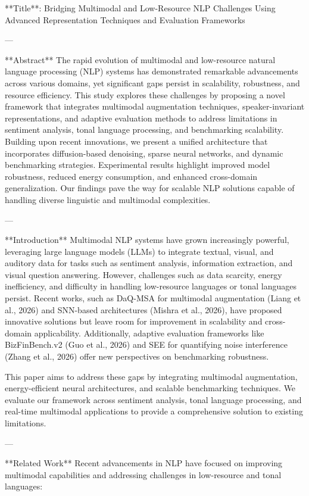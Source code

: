 **Title**: Bridging Multimodal and Low-Resource NLP Challenges Using Advanced Representation Techniques and Evaluation Frameworks  

---

**Abstract**  
The rapid evolution of multimodal and low-resource natural language processing (NLP) systems has demonstrated remarkable advancements across various domains, yet significant gaps persist in scalability, robustness, and resource efficiency. This study explores these challenges by proposing a novel framework that integrates multimodal augmentation techniques, speaker-invariant representations, and adaptive evaluation methods to address limitations in sentiment analysis, tonal language processing, and benchmarking scalability. Building upon recent innovations, we present a unified architecture that incorporates diffusion-based denoising, sparse neural networks, and dynamic benchmarking strategies. Experimental results highlight improved model robustness, reduced energy consumption, and enhanced cross-domain generalization. Our findings pave the way for scalable NLP solutions capable of handling diverse linguistic and multimodal complexities.

---

**Introduction**  
Multimodal NLP systems have grown increasingly powerful, leveraging large language models (LLMs) to integrate textual, visual, and auditory data for tasks such as sentiment analysis, information extraction, and visual question answering. However, challenges such as data scarcity, energy inefficiency, and difficulty in handling low-resource languages or tonal languages persist. Recent works, such as DaQ-MSA for multimodal augmentation (Liang et al., 2026) and SNN-based architectures (Mishra et al., 2026), have proposed innovative solutions but leave room for improvement in scalability and cross-domain applicability. Additionally, adaptive evaluation frameworks like BizFinBench.v2 (Guo et al., 2026) and SEE for quantifying noise interference (Zhang et al., 2026) offer new perspectives on benchmarking robustness.

This paper aims to address these gaps by integrating multimodal augmentation, energy-efficient neural architectures, and scalable benchmarking techniques. We evaluate our framework across sentiment analysis, tonal language processing, and real-time multimodal applications to provide a comprehensive solution to existing limitations.

---

**Related Work**  
Recent advancements in NLP have focused on improving multimodal capabilities and addressing challenges in low-resource and tonal languages:

